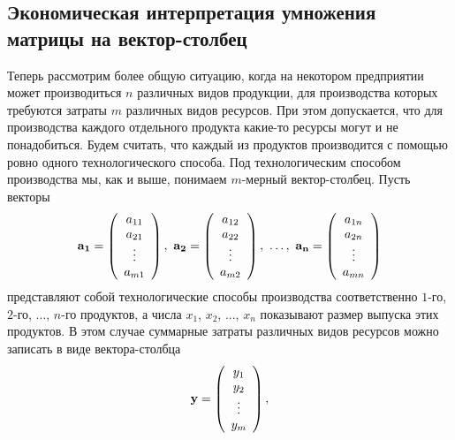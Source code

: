 \subsection{Экономическая интерпретация умножения матрицы на вектор-столбец}
    Теперь рассмотрим более общую ситуацию, когда на некотором
    предприятии может производиться  $n$
    различных видов продукции, для производства которых требуются затраты
    $m$ различных видов ресурсов. При этом допускается, что для
    производства каждого отдельного продукта какие-то ресурсы могут и не
    понадобиться. Будем считать, что каждый из продуктов
    производится с помощью ровно одного технологического способа. Под технологическим
    способом  производства мы, как и выше, понимаем $m$-мерный
    вектор-столбец. Пусть векторы
    \[\mathbf{a_{1}}=\left(
     \begin{array}{c}
        a_{11} \\
        a_{21} \\
        \vdots \\
        a_{m1}  \\
      \end{array}
    \right),\
    \mathbf{a_{2}}=\left(
     \begin{array}{c}
        a_{12} \\
        a_{22} \\
        \vdots \\
        a_{m2}  \\
      \end{array}
    \right),\ \ldots,\
    \mathbf{a_{n}}=\left(
     \begin{array}{c}
        a_{1n} \\
        a_{2n} \\
        \vdots \\
        a_{mn}  \\
      \end{array}
    \right)\]
    представляют собой технологические способы производства
    соответственно $1$-го,  $2$-го, ..., $n$-го продуктов, а числа
    $x_{1}$, $x_{2}$, ..., $x_{n}$ показывают размер выпуска этих
    продуктов. В этом случае суммарные затраты различных видов
    ресурсов можно записать в виде вектора-столбца
    \[\mathbf{y}=\left(
     \begin{array}{c}
        y_{1} \\
        y_{2} \\
        \vdots \\
        y_{m}  \\
      \end{array}
    \right),\]

